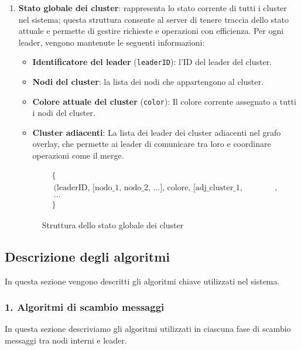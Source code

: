 \documentclass[12pt, a4paper]{report}
\begin{document}
\begin{enumerate}
    \item \textbf{Stato globale dei cluster}: rappresenta lo stato corrente di tutti i cluster nel sistema; questa struttura consente al server di tenere traccia dello stato attuale e permette di gestire richieste e operazioni con efficienza. Per ogni leader, vengono mantenute le seguenti informazioni:
    \begin{itemize}
        \item \textbf{Identificatore del leader} (\texttt{leaderID}): l'ID del leader del cluster.
        \item \textbf{Nodi del cluster}: la lista dei nodi che appartengono al cluster.
        \item \textbf{Colore attuale del cluster} (\texttt{color}): Il colore corrente assegnato a tutti i nodi del cluster.
        \item \textbf{Cluster adiacenti}: La lista dei leader dei cluster adiacenti nel grafo overlay, che permette ai leader di comunicare tra loro e coordinare operazioni come il merge.
    \end{itemize}
    \vspace{-20pt}
    \begin{figure}[H]
    \begin{align*}
            &\{ \\
            &\ \text{(leaderID, [nodo\_1, nodo\_2, \ldots], colore, [adj\_cluster\_1, adj\_cluster\_2, \ldots])}, \\
            &\ \ldots \\
            &\}
        \end{align*}
        \vspace{-20pt}
        \caption{Struttura dello stato globale dei cluster}
        \label{fig:global_cluster_state}
    \end{figure}

\end{enumerate}

\subsection{Descrizione degli algoritmi}

In questa sezione vengono descritti gli algoritmi chiave utilizzati nel sistema.

\subsubsection{1. Algoritmi di scambio messaggi}
\label{subsec:scambio_messaggi}
In questa sezione descriviamo gli algoritmi utilizzati in ciascuna fase di scambio messaggi tra nodi interni e leader.
\end{document}
